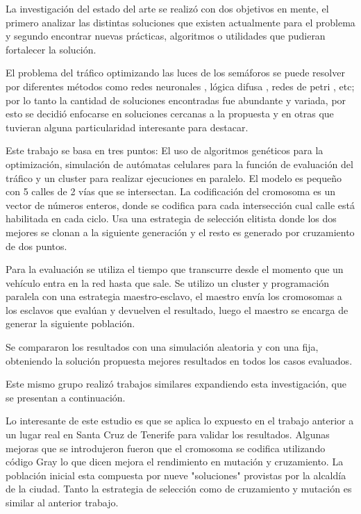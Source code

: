 La investigación del estado del arte se realizó con dos objetivos en mente, el primero analizar las distintas soluciones que existen actualmente para el problema y segundo encontrar nuevas prácticas, algoritmos o utilidades que pudieran fortalecer la solución.

El problema del tráfico optimizando las luces de los semáforos se puede resolver por diferentes métodos como  redes neuronales \citep{Lopez1999}, lógica difusa \citep{Lim2001}, redes de petri \citep{DiFebbraro2002}, etc; por lo tanto la cantidad de soluciones encontradas fue abundante y variada, por esto se decidió enfocarse en soluciones cercanas a la propuesta y en otras que tuvieran alguna particularidad interesante para destacar.


\begin{itemize}
	\begin{item}
		
		Este trabajo se basa en tres puntos: El uso de algoritmos genéticos para la optimización, simulación de autómatas celulares para la función de evaluación del tráfico y un cluster para realizar ejecuciones en paralelo.
		El modelo es pequeño con 5 calles de 2 vías que se intersectan.
		La codificación del cromosoma es un vector de números enteros, donde se codifica para cada intersección cual calle está habilitada en cada ciclo.
		Usa una estrategia de selección elitista donde los dos mejores se clonan a la siguiente generación y el resto es generado por cruzamiento de dos puntos.
		
		Para la evaluación se utiliza el tiempo que transcurre desde el momento que un vehículo entra en la red hasta que sale. Se utilizo un cluster y programación paralela con una estrategia maestro-esclavo, el maestro envía los cromosomas a los esclavos que evalúan y devuelven el resultado, luego el maestro se encarga de generar la siguiente población.
		
		Se compararon los resultados con una simulación aleatoria y con una fija, obteniendo la solución propuesta mejores resultados en todos los casos evaluados.
		
		Este mismo grupo realizó trabajos similares expandiendo esta investigación, que se presentan a continuación.
	\end{item}
	
	\begin{item}
		\bibentry{Sanchez2008}
		Lo interesante de este estudio es que se aplica lo expuesto en el trabajo anterior a un lugar real en Santa Cruz de Tenerife para validar los resultados.
		Algunas mejoras que se introdujeron fueron que el cromosoma se codifica utilizando código Gray lo que dicen mejora el rendimiento en mutación y cruzamiento. La población inicial esta compuesta por nueve "soluciones" provistas por la alcaldía de la ciudad. Tanto la estrategia de selección como de cruzamiento y mutación es similar al anterior trabajo.
		

\end{item}
\end{itemize}
